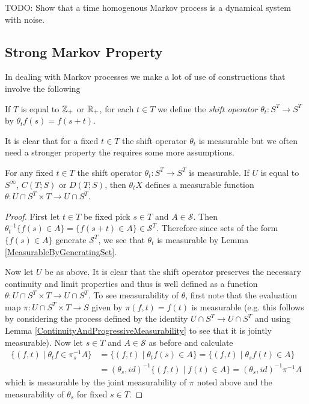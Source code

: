 TODO: Show that a time homogenous Markov process is a dynamical system
with noise.

\subsection{Strong Markov Property}

In dealing with Markov processes we make a lot of use of constructions
that involve the following
\begin{defn}If $T$ is equal to $\mathbb{Z}_+$ or $\mathbb{R}_+$, for each
  $t \in T$ we define
  the \emph{shift operator}  $\theta_t : S^T \to S^T$ by $\theta_t f
  (s) = f(s +t)$.
\end{defn}

It is clear that for a fixed $t \in T$ the shift operator $\theta_t$
is measurable but we often need a stronger property the requires some
more assumptions.
\begin{lem}\label{MeasurabilityOfShiftOperator}For any fixed $t \in T$ the shift operator $\theta_t : S^T
  \to S^T$ is measurable. If $U$ is equal to $S^\infty$, $C(T; S)$ or
  $D(T; S)$, then $\theta_t X$ defines a measurable function $\theta : U \cap S^T \times
  T \to U \cap S^T$.  
\end{lem}
\begin{proof}
First let $t \in T$ be fixed pick $s \in T$ and $A \in \mathcal{S}$.
Then $\theta_t^{-1} \lbrace f(s) \in A \rbrace = \lbrace f(s+t) \in A
\rbrace \in \mathcal{S}^T$.  Therefore since sets of the form $\lbrace f(s) \in A \rbrace$ generate
$\mathcal{S}^T$, we see that $\theta_t$ is measurable by Lemma
\ref{MeasurableByGeneratingSet}.

Now let $U$ be as above.  It is clear that the shift operator
preserves the necessary continuity and limit properties and thus is
well defined as a function $\theta : U \cap S^T \times T \to U \cap S^T$.  To
see measurability of $\theta$, first note that the evaluation map $\pi : U \cap S^T \times
T \to S$ given by $\pi(f,t) = f(t)$ is measurable (e.g. this follows
by considering the process defined by the identity $U
\cap S^T \to U \cap S^T$ and using Lemma
\ref{ContinuityAndProgressiveMeasurability} to see that it is jointly
measurable).
Now let $s \in T$ and $A
\in \mathcal{S}$ as before and calculate
\begin{align*}
\lbrace (f, t) \mid \theta_t f \in \pi_s^{-1} A \rbrace
&=
\lbrace (f, t) \mid \theta_t f(s) \in  A \rbrace 
=\lbrace (f, t) \mid \theta_s f(t) \in  A \rbrace \\
&= (\theta_s, id)^{-1} \lbrace (f, t) \mid f(t) \in  A \rbrace
= (\theta_s, id)^{-1} \pi^{-1} A
\end{align*}
which is measurable by the joint measurability of $\pi$ noted above
and the measurability of $\theta_s$ for fixed $s \in T$.
\end{proof}

